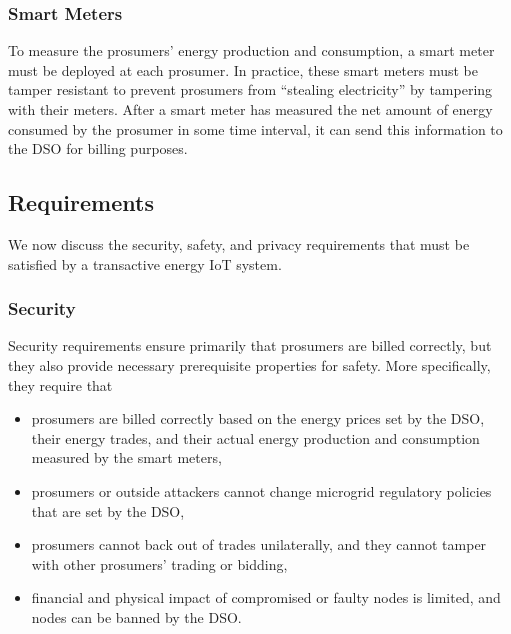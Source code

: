 \subsubsection{Smart Meters}
To measure the prosumers' energy production and consumption, a smart
meter must be deployed at each prosumer.  In practice, these smart
meters must be tamper resistant to prevent prosumers from ``stealing
electricity'' by tampering with their meters.  After a smart meter has
measured the net amount of energy consumed by the prosumer in some
time interval, it can send this information to the DSO for billing
purposes.

\subsection{Requirements}
We now discuss the security, safety, and privacy requirements that
must be satisfied by a transactive energy IoT system.

\subsubsection{Security}
Security requirements ensure primarily that prosumers are billed
correctly, but they also provide necessary prerequisite properties for
safety.
More specifically, they require that
\begin{itemize}[noitemsep,topsep=-\parskip]
\item prosumers are billed correctly based on the energy prices set by
  the DSO, their energy trades, and their actual energy production and
  consumption measured by the smart meters,
\item prosumers or outside attackers cannot change microgrid
  regulatory policies that are set by the DSO, 
\item prosumers cannot back out of trades unilaterally, and they
  cannot tamper with other prosumers' trading or bidding,
\item financial and physical impact of compromised or faulty nodes is
  limited, and nodes can be banned by the DSO. 
\end{itemize}


